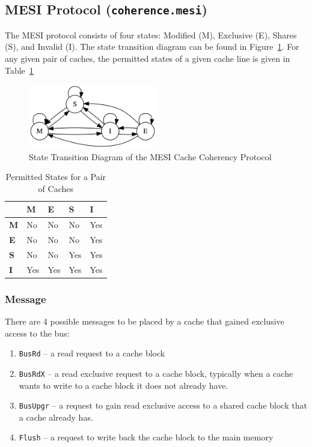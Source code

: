 \documentclass[nonacm,acmsmall,screen,11pt]{acmart}
\begin{document}
\subsection{MESI Protocol (\texttt{coherence.mesi})}
The MESI protocol consists of four states: Modified (M), Exclusive (E), Shares (S), and Invalid (I).
The state transition diagram can be found in Figure~\ref{fig:mesi}.
For any given pair of caches, the permitted states of a given cache line is given in Table~\ref{tab:mesi}

\begin{figure}[hptb]
  \centering
  \includegraphics[width=0.5\textwidth]{mesi}
  \caption{State Transition Diagram of the MESI Cache Coherency Protocol}
  \label{fig:mesi}
\end{figure}

\begin{table}[hptb]
  \centering
  \begin{tabular}{|l|l|l|l|l|}
    \hline
               & \textbf{M} & \textbf{E} & \textbf{S} & \textbf{I} \\ \hline
    \textbf{M} & No         & No         & No         & Yes        \\ \hline
    \textbf{E} & No         & No         & No         & Yes        \\ \hline
    \textbf{S} & No         & No         & Yes        & Yes        \\ \hline
    \textbf{I} & Yes        & Yes        & Yes        & Yes        \\ \hline
  \end{tabular}
  \caption{Permitted States for a Pair of Caches}
  \label{tab:mesi}
\end{table}

\subsubsection{Message}
There are 4 possible messages to be placed by a cache that gained exclusive access to the bus:
\begin{enumerate}
  \item \texttt{BusRd} -- a read request to a cache block
  \item \texttt{BusRdX} -- a read exclusive request to a cache block, typically when a cache wants to write to a cache block it does not already have.
  \item \texttt{BusUpgr} -- a request to gain read exclusive access to a shared cache block that a cache already has.
  \item \texttt{Flush} -- a request to write back the cache block to the main memory
\end{enumerate}
\end{document}
